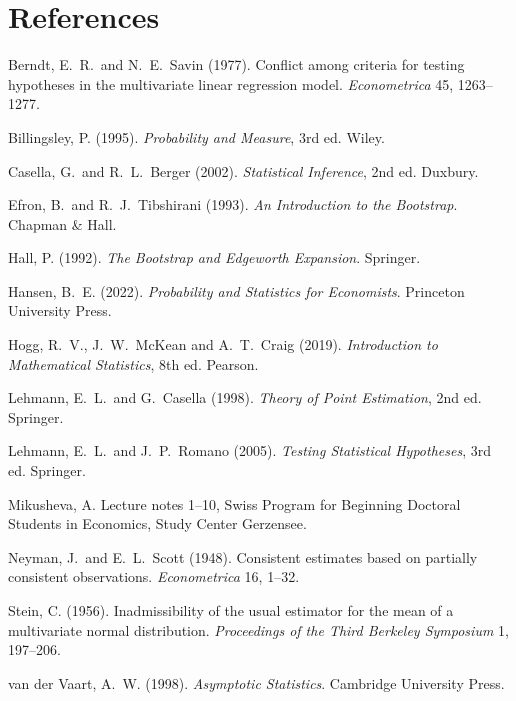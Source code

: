 \documentclass[11pt,a4paper]{article}
\begin{document}
\section*{References}
{\small
{}
\begin{description}[leftmargin=1.4em,labelindent=0pt,itemsep=2pt,font=\normalfont]
\item Berndt, E.~R.\ and N.~E.~Savin (1977). Conflict among criteria for testing hypotheses in the multivariate linear regression model. \emph{Econometrica} 45, 1263--1277.
\item Billingsley, P. (1995). \emph{Probability and Measure}, 3rd ed. Wiley.
\item Casella, G.\ and R.~L.~Berger (2002). \emph{Statistical Inference}, 2nd ed. Duxbury.
\item Efron, B.\ and R.~J.~Tibshirani (1993). \emph{An Introduction to the Bootstrap}. Chapman \& Hall.
\item Hall, P. (1992). \emph{The Bootstrap and Edgeworth Expansion}. Springer.
\item Hansen, B.~E. (2022). \emph{Probability and Statistics for Economists}. Princeton University Press.
\item Hogg, R.~V., J.~W.~McKean and A.~T.~Craig (2019). \emph{Introduction to Mathematical Statistics}, 8th ed. Pearson.
\item Lehmann, E.~L.\ and G.~Casella (1998). \emph{Theory of Point Estimation}, 2nd ed. Springer.
\item Lehmann, E.~L.\ and J.~P.~Romano (2005). \emph{Testing Statistical Hypotheses}, 3rd ed. Springer.
\item Mikusheva, A. Lecture notes 1--10, Swiss Program for Beginning Doctoral Students in Economics, Study Center Gerzensee.
\item Neyman, J.\ and E.~L.~Scott (1948). Consistent estimates based on partially consistent observations. \emph{Econometrica} 16, 1--32.
\item Stein, C. (1956). Inadmissibility of the usual estimator for the mean of a multivariate normal distribution. \emph{Proceedings of the Third Berkeley Symposium} 1, 197--206.
\item van der Vaart, A.~W. (1998). \emph{Asymptotic Statistics}. Cambridge University Press.
\end{description}
}
\end{document}
